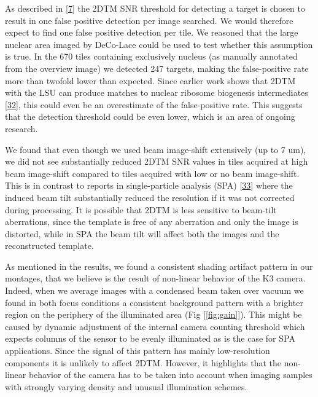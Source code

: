 \documentclass[
]{article}
\begin{document}
As described in {[}\protect\hyperlink{ref-Ynb3IP6I}{7}{]} the 2DTM SNR threshold for detecting a target is chosen to result in one false positive detection per image searched. We would therefore expect to find one false positive detection per tile. We reasoned that the large nuclear area imaged by DeCo-Lace could be used to test whether this assumption is true. In the 670 tiles containing exclusively nucleus (as manually annotated from the overview image) we detected 247 targets, making the false-positive rate more than twofold lower than expected. Since earlier work shows that 2DTM with the LSU can produce matches to nuclear ribosome biogenesis intermediates {[}\protect\hyperlink{ref-T1Qr0xyP}{32}{]}, this could even be an overestimate of the false-positive rate. This suggests that the detection threshold could be even lower, which is an area of ongoing research.

We found that even though we used beam image-shift extensively (up to 7 um), we did not see substantially reduced 2DTM SNR values in tiles acquired at high beam image-shift compared to tiles acquired with low or no beam image-shift. This is in contrast to reports in single-particle analysis (SPA) {[}\protect\hyperlink{ref-44fG6kcy}{33}{]} where the induced beam tilt substantially reduced the resolution if it was not corrected during processing. It is possible that 2DTM is less sensitive to beam-tilt aberrations, since the template is free of any aberration and only the image is distorted, while in SPA the beam tilt will affect both the images and the reconstructed template.

As mentioned in the results, we found a consistent shading artifact pattern in our montages, that we believe is the result of non-linear behavior of the K3 camera. Indeed, when we average images with a condensed beam taken over vacuum we found in both focus conditions a consistent background pattern with a brighter region on the periphery of the illuminated area (Fig {[}\ref{fig:gain}{]}). This might be caused by dynamic adjustment of the internal camera counting threshold which expects columns of the sensor to be evenly illuminated as is the case for SPA applications. Since the signal of this pattern has mainly low-resolution components it is unlikely to affect 2DTM. However, it highlights that the non-linear behavior of the camera has to be taken into account when imaging samples with strongly varying density and unusual illumination schemes.
\end{document}
